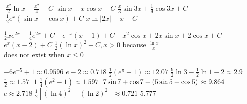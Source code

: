 \begin{Answer}[ref={exIBP}]
\Question %
\begin{tasks}
	\task $\;\frac{x^{2}}{2} \ln  x -\frac{x^{2}}{4} +C$
	\task $\sin  x -x \cos  x +C$ 
	\task $\frac{x}{3} \sin  3 x +\frac{1}{9} \cos  3 x +C$ 
	\task $\;\frac{1}{2} e^{x} \left (\sin  x -\cos  x\right ) +C$ 
	\task $x\ln \left \vert 2 x\right \vert  -x +C$ 
\end{tasks}

\Question %

\Question %
\begin{tasks}
	\task $\frac{1}{2} x e^{2 x} -\frac{1}{4} e^{2 x} +C$
	\task $ -e^{ -x} \left (x +1\right ) +C$ 
	\task $ -x^{2} \cos  x +2 x \sin  x +2 \cos  x +C$ 
	\task $e^{x} \left (x -2\right ) +C$
	\task $\frac{1}{2} \left (\ln  x\right )^{2} +C ,x >0$ because $\frac{\ln  x}{x}$ \\
	does not exist when $x \leq 0$ 
\end{tasks}

\Question %
\begin{tasks}
	\task $ -6 e^{ -5} +1 \approx 0.9596$
	\task $e -2 \approx 0.718$ 
	\task $\frac{1}{2} \left (e^{\pi } +1\right ) \approx 12.07$ 
	\task $\frac{9}{2} \ln  3 -\frac{1}{2} \ln  1 -2 \approx 2.9$ 
	\task $\frac{\pi }{2} \approx 1.57$ 
	\task $\;1$ 
	\task $\frac{1}{4} \left (e^{2} -1\right ) \approx 1.597$ 
	\task $\;7 \sin  7 +\cos  7 -\left (5 \sin  5 +\cos  5\right ) \\
	\approx 9.864$
	\task $e \approx 2.718$ 
	\task $\frac{1}{2} \left [\left (\ln  4\right )^{2} -\left (\ln  2\right )^{2}\right ] \approx 0.721$ 
	\task $5.777$ 
\end{tasks}	
	
\end{Answer}%

